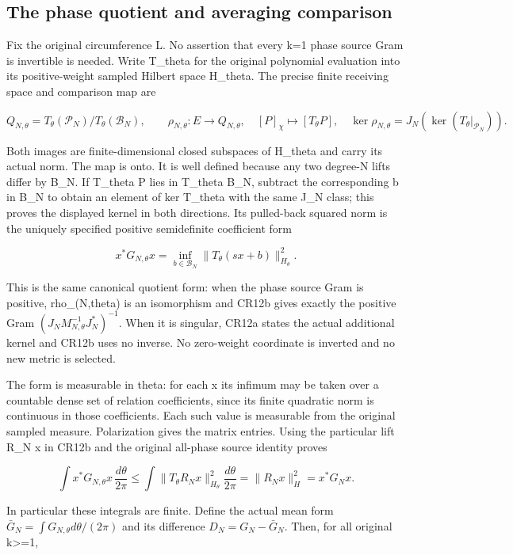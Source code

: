 \subsection{The phase quotient and averaging comparison}\label{the-phase-quotient-and-averaging-comparison}

Fix the original circumference L. No assertion that every k=1 phase source Gram is invertible is needed. Write T\_theta for the original polynomial evaluation into its positive-weight sampled Hilbert space H\_theta. The precise finite receiving space and comparison map are

\[
Q_{N,\theta}=T_\theta(\mathcal P_N)/T_\theta(\mathcal B_N),\qquad
\rho_{N,\theta}:E\longrightarrow Q_{N,\theta},\quad
[P]_\chi\longmapsto[T_\theta P],\quad
\ker\rho_{N,\theta}=J_N(\ker(T_\theta|_{\mathcal P_N})).
\tag{CR12a}
\]

Both images are finite-dimensional closed subspaces of H\_theta and carry its actual norm. The map is onto. It is well defined because any two degree-N lifts differ by B\_N. If T\_theta P lies in T\_theta B\_N, subtract the corresponding b in B\_N to obtain an element of ker T\_theta with the same J\_N class; this proves the displayed kernel in both directions. Its pulled-back squared norm is the uniquely specified positive semidefinite coefficient form

\[
x^*G_{N,\theta}x
=\inf_{b\in\mathcal B_N}\|T_\theta(sx+b)\|_{H_\theta}^2.
\tag{CR12b}
\]

This is the same canonical quotient form: when the phase source Gram is positive, rho\_(N,theta) is an isomorphism and CR12b gives exactly the positive Gram \((J_NM_{N,\theta}^{-1}J_N^*)^{-1}\). When it is singular, CR12a states the actual additional kernel and CR12b uses no inverse. No zero-weight coordinate is inverted and no new metric is selected.

The form is measurable in theta: for each x its infimum may be taken over a countable dense set of relation coefficients, since its finite quadratic norm is continuous in those coefficients. Each such value is measurable from the original sampled measure. Polarization gives the matrix entries. Using the particular lift R\_N x in CR12b and the original all-phase source identity proves

\[
\int x^*G_{N,\theta}x\,\frac{d\theta}{2\pi}
\le\int\|T_\theta R_Nx\|_{H_\theta}^2\frac{d\theta}{2\pi}
=\|R_Nx\|_H^2=x^*G_Nx.
\tag{CR12c}
\]

In particular these integrals are finite. Define the actual mean form \(\bar G_N=\int G_{N,\theta}d\theta/(2\pi)\) and its difference \(D_N=G_N-\bar G_N\). Then, for all original k\textgreater=1,

